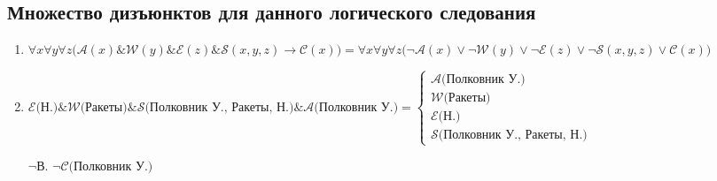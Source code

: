 \documentclass[titlepage,10pt,a4paper]{article}
\begin{document}
\subsection{Множество дизъюнктов для данного логического следования}
\begin{enumerate}
\item $\forall x\forall y\forall z \bigl( \mathcal{A} \left(x\right) \& \mathcal{W} \left(y\right) \& \mathcal{E} \left(z\right) \& \mathcal{S}\left(x,y,z\right)\rightarrow\mathcal{C}\left(x\right)\bigr) =
\forall x\forall y\forall z \bigl( \neg{\mathcal{A}}\left(x\right) \lor \neg{\mathcal{W}}\left(y\right) \lor \neg{\mathcal{E}}\left(z\right) \lor \neg\mathcal{S}\left(x, y, z\right) \lor \mathcal{C}\left(x\right)\bigr)$
\item $\mathcal{E}\bigl(\text{Н.}\bigr) \& \mathcal{W}\bigl(\text{Ракеты}\bigr) \& \mathcal{S}\bigl(\text{Полковник У., Ракеты, Н.}\bigr) \& \mathcal{A}\bigl(\text{Полковник У.}\bigr) = \begin{cases}
\mathcal{A}\bigl(\text{Полковник У.}\bigr)\\
\mathcal{W}\bigl(\text{Ракеты}\bigr)\\
\mathcal{E}\bigl(\text{Н.}\bigr)\\
\mathcal{S}\bigl(\text{Полковник У., Ракеты, Н.}\bigr) \end{cases}$
\item[$\neg$В.] $\neg\mathcal{C}\bigl(\text{Полковник У.}\bigr)$
\end{enumerate}
\end{document}

